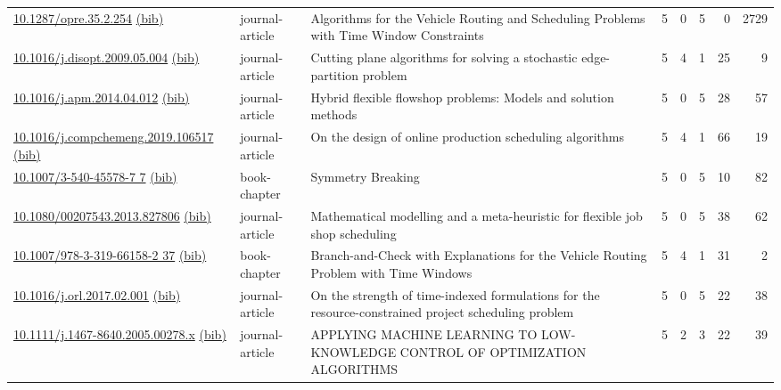 {\begin{longtable}{p{5cm}lp{11cm}rrrrr}
\href{http://dx.doi.org/10.1287/opre.35.2.254}{10.1287/opre.35.2.254} \href{https://www.doi2bib.org/bib/10.1287/opre.35.2.254}{(bib)} & journal-article & Algorithms for the Vehicle Routing and Scheduling Problems with Time Window Constraints & 5 & 0 & 5 & 0 & 2729 \\
\href{http://dx.doi.org/10.1016/j.disopt.2009.05.004}{10.1016/j.disopt.2009.05.004} \href{https://www.doi2bib.org/bib/10.1016/j.disopt.2009.05.004}{(bib)} & journal-article & Cutting plane algorithms for solving a stochastic edge-partition problem & 5 & 4 & 1 & 25 & 9 \\
\href{http://dx.doi.org/10.1016/j.apm.2014.04.012}{10.1016/j.apm.2014.04.012} \href{https://www.doi2bib.org/bib/10.1016/j.apm.2014.04.012}{(bib)} & journal-article & Hybrid flexible flowshop problems: Models and solution methods & 5 & 0 & 5 & 28 & 57 \\
\href{http://dx.doi.org/10.1016/j.compchemeng.2019.106517}{10.1016/j.compchemeng.2019.106517} \href{https://www.doi2bib.org/bib/10.1016/j.compchemeng.2019.106517}{(bib)} & journal-article & On the design of online production scheduling algorithms & 5 & 4 & 1 & 66 & 19 \\
\href{http://dx.doi.org/10.1007/3-540-45578-7_7}{10.1007/3-540-45578-7 7} \href{https://www.doi2bib.org/bib/10.1007/3-540-45578-7_7}{(bib)} & book-chapter & Symmetry Breaking & 5 & 0 & 5 & 10 & 82 \\
\href{http://dx.doi.org/10.1080/00207543.2013.827806}{10.1080/00207543.2013.827806} \href{https://www.doi2bib.org/bib/10.1080/00207543.2013.827806}{(bib)} & journal-article & Mathematical modelling and a meta-heuristic for flexible job shop scheduling & 5 & 0 & 5 & 38 & 62 \\
\href{http://dx.doi.org/10.1007/978-3-319-66158-2_37}{10.1007/978-3-319-66158-2 37} \href{https://www.doi2bib.org/bib/10.1007/978-3-319-66158-2_37}{(bib)} & book-chapter & Branch-and-Check with Explanations for the Vehicle Routing Problem with Time Windows & 5 & 4 & 1 & 31 & 2 \\
\href{http://dx.doi.org/10.1016/j.orl.2017.02.001}{10.1016/j.orl.2017.02.001} \href{https://www.doi2bib.org/bib/10.1016/j.orl.2017.02.001}{(bib)} & journal-article & On the strength of time-indexed formulations for the resource-constrained project scheduling problem & 5 & 0 & 5 & 22 & 38 \\
\href{http://dx.doi.org/10.1111/j.1467-8640.2005.00278.x}{10.1111/j.1467-8640.2005.00278.x} \href{https://www.doi2bib.org/bib/10.1111/j.1467-8640.2005.00278.x}{(bib)} & journal-article & APPLYING MACHINE LEARNING TO LOW-KNOWLEDGE CONTROL OF OPTIMIZATION ALGORITHMS & 5 & 2 & 3 & 22 & 39 \\

\end{longtable}}

